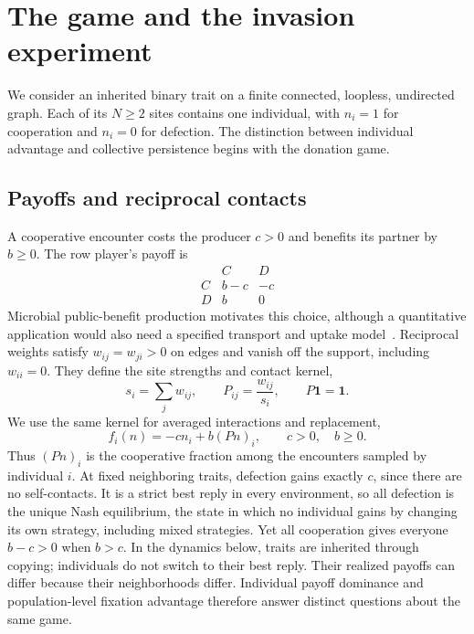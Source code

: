 \documentclass[aps,pre,reprint,amsmath,amssymb,longbibliography]{revtex4-2}
\newcommand{\one}{\bm 1}
\begin{document}
\section{The game and the invasion experiment}
\label{sec:model}
We consider an inherited binary trait on a finite connected, loopless,
undirected graph. Each of its $N\ge2$ sites contains one individual,
with $n_i=1$ for cooperation and $n_i=0$ for defection. The distinction
between individual advantage and collective persistence begins with
the donation game.

\subsection{Payoffs and reciprocal contacts}
\label{sec:game}
A cooperative encounter costs the producer $c>0$ and benefits its
partner by $b\ge0$. The row player's payoff is
\begin{equation}
 \begin{array}{c|cc}
       & C & D\\ \hline
 C&b-c&-c\\
 D&b&0
 \end{array}
 \label{eq:donation-matrix}
\end{equation}
Microbial public-benefit production motivates this choice, although a
quantitative application would also need a specified transport and
uptake model~\cite{AllenGoreNowak2013}. Reciprocal weights satisfy
$w_{ij}=w_{ji}>0$ on edges and vanish off the support, including $w_{ii}=0$.
They define the site strengths and contact kernel,
\begin{equation}
 s_i=\sum_jw_{ij},\qquad P_{ij}=\frac{w_{ij}}{s_i},
 \qquad P\one=\one .
 \label{eq:kernel}
\end{equation}
We use the same kernel for averaged interactions and replacement,
\begin{equation}
 f_i(n)=-cn_i+b(Pn)_i,\qquad c>0,\quad b\ge0.
 \label{eq:payoff}
\end{equation}
Thus $(Pn)_i$ is the cooperative fraction among the encounters sampled by individual $i$.
At fixed neighboring traits, defection gains exactly $c$, since there
are no self-contacts. It is a strict best reply in every environment,
so all defection is the unique Nash equilibrium, the state in which
no individual gains by changing its own strategy, including mixed
strategies. Yet all cooperation gives everyone $b-c>0$ when $b>c$.
In the dynamics below, traits are inherited through copying; individuals
do not switch to their best reply. Their realized payoffs can differ
because their neighborhoods differ. Individual payoff dominance and population-level fixation advantage
therefore answer distinct questions about the same game.
\end{document}
